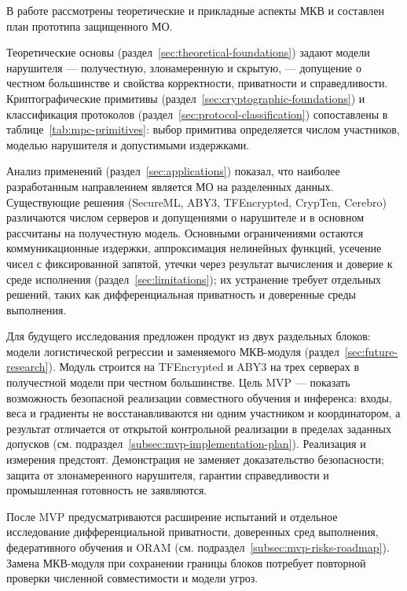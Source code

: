 \conclusion
В работе рассмотрены теоретические и прикладные аспекты МКВ и составлен план прототипа защищенного МО.

Теоретические основы (раздел~\ref{sec:theoretical-foundations}) задают модели нарушителя --- получестную, злонамеренную и скрытую, --- допущение о честном большинстве и свойства корректности, приватности и справедливости. Криптографические примитивы (раздел~\ref{sec:cryptographic-foundations}) и классификация протоколов (раздел~\ref{sec:protocol-classification}) сопоставлены в таблице~\ref{tab:mpc-primitives}: выбор примитива определяется числом участников, моделью нарушителя и допустимыми издержками.

Анализ применений (раздел~\ref{sec:applications}) показал, что наиболее разработанным направлением является МО на разделенных данных. Существующие решения (SecureML, ABY3, TFEncrypted, CrypTen, Cerebro) различаются числом серверов и допущениями о нарушителе и в основном рассчитаны на получестную модель. Основными ограничениями остаются коммуникационные издержки, аппроксимация нелинейных функций, усечение чисел с фиксированной запятой, утечки через результат вычисления и доверие к среде исполнения (раздел~\ref{sec:limitations}); их устранение требует отдельных решений, таких как дифференциальная приватность и доверенные среды выполнения.

Для будущего исследования предложен продукт из двух раздельных блоков: модели логистической регрессии и заменяемого МКВ-модуля (раздел~\ref{sec:future-research}). Модуль строится на TFEncrypted и ABY3 на трех серверах в получестной модели при честном большинстве. Цель MVP --- показать возможность безопасной реализации совместного обучения и инференса: входы, веса и градиенты не восстанавливаются ни одним участником и координатором, а результат отличается от открытой контрольной реализации в пределах заданных допусков (см. подраздел~\ref{subsec:mvp-implementation-plan}). Реализация и измерения предстоят. Демонстрация не заменяет доказательство безопасности; защита от злонамеренного нарушителя, гарантии справедливости и промышленная готовность не заявляются.

После MVP предусматриваются расширение испытаний и отдельное исследование дифференциальной приватности, доверенных сред выполнения, федеративного обучения и ORAM (см. подраздел~\ref{subsec:mvp-risks-roadmap}). Замена МКВ-модуля при сохранении границы блоков потребует повторной проверки численной совместимости и модели угроз.